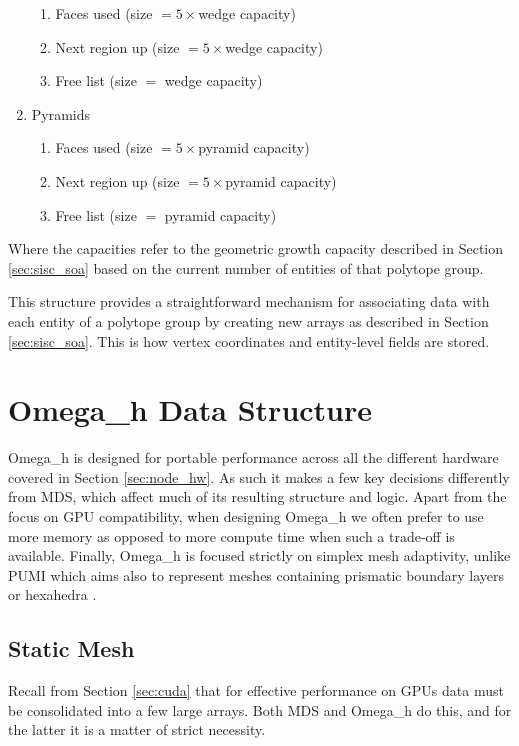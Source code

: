 \begin{enumerate}
  \begin{enumerate}
  \item Faces used (size $=5\times$wedge capacity)
  \item Next region up (size $=5\times$wedge capacity)
  \item Free list (size $=$ wedge capacity)
  \end{enumerate}
\item Pyramids
  \begin{enumerate}
  \item Faces used (size $=5\times$pyramid capacity)
  \item Next region up (size $=5\times$pyramid capacity)
  \item Free list (size $=$ pyramid capacity)
  \end{enumerate}
\end{enumerate}
Where the capacities refer to the geometric growth
capacity described in Section \ref{sec:sisc_soa} based
on the current number of entities of that polytope group.

This structure provides a straightforward mechanism for associating
data with each entity of a polytope group by creating
new arrays as described in Section \ref{sec:sisc_soa}.
This is how vertex coordinates and entity-level fields
are stored.

\section{Omega\_h Data Structure}
\label{sec:omega_h-struct}

Omega\_h is designed for portable performance across
all the different hardware covered in Section \ref{sec:node_hw}.
As such it makes a few key decisions differently from MDS,
which affect much of its resulting structure and logic.
Apart from the focus on GPU compatibility, when designing
Omega\_h we often prefer to use more memory as opposed
to more compute time when such a trade-off is available.
Finally, Omega\_h is focused strictly on simplex mesh
adaptivity, unlike PUMI which aims also to represent
meshes containing prismatic boundary layers \cite{ovcharenko2013parallel}
or hexahedra \cite{seol2006efficient}.

\subsection{Static Mesh}
\label{sec:osh_static}

Recall from Section \ref{sec:cuda} that for effective
performance on GPUs data must be consolidated into
a few large arrays.
Both MDS and Omega\_h do this, and for the latter it is
a matter of strict necessity.

